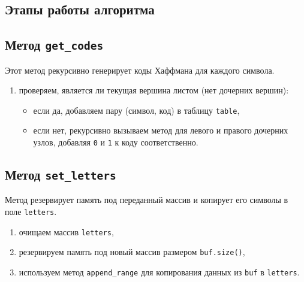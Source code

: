 \subsection*{Этапы работы алгоритма}

\subsection{Метод \texttt{get\_codes}}
Этот метод рекурсивно генерирует коды Хаффмана для каждого символа.
\begin{enumerate}
	\item проверяем, является ли текущая вершина листом (нет дочерних вершин):
	\begin{itemize}
		\item если да, добавляем пару (символ, код) в таблицу \texttt{table},
		\item если нет, рекурсивно вызываем метод для левого и правого дочерних узлов, добавляя \texttt{0} и \texttt{1} к коду соответственно.
	\end{itemize}
\end{enumerate}

\subsection{Метод \texttt{set\_letters}}
Метод резервирует память под переданный массив и копирует его символы в поле \texttt{letters}.
\begin{enumerate}
	\item очищаем массив \texttt{letters},
	\item резервируем память под новый массив размером \texttt{buf.size()},
	\item используем метод \texttt{append\_range} для копирования данных из \texttt{buf} в \texttt{letters}.
\end{enumerate}

